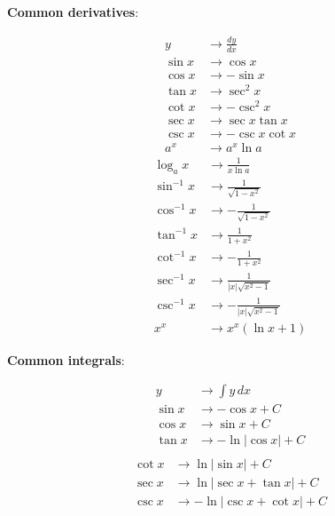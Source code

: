 \documentclass[a4paper,landscape]{article}
\newcommand{\rnname}[1]{\textbf{#1}}
\begin{document}
\begin{multicols*}{3}
\begin{flatitemize}
\item \rnname{Common derivatives}:
\vspace{-2.5em}
\begin{adjustwidth}{-1.2em}{0pt}
\begin{multicols*}{2}
\begin{align*}
y &\longrightarrow \frac{dy}{dx} \\
\sin x &\longrightarrow \cos x \\
\cos x &\longrightarrow -\sin x \\
\tan x &\longrightarrow \sec^2 x \\
\cot x &\longrightarrow -\csc^2 x \\
\sec x &\longrightarrow \sec x \tan x \\
\csc x &\longrightarrow -\csc x \cot x \\
a^x &\longrightarrow a^x \ln a
\end{align*}
\begin{align*}
\log_a x &\textstyle \longrightarrow \frac{1}{x \ln a} \\
\sin^{-1} x &\textstyle \longrightarrow \frac{1}{\sqrt{1-x^2}} \\
\cos^{-1} x &\textstyle \longrightarrow -\frac{1}{\sqrt{1-x^2}} \\
\tan^{-1} x &\textstyle \longrightarrow \frac{1}{1+x^2} \\
\cot^{-1} x &\textstyle \longrightarrow -\frac{1}{1+x^2} \\
\sec^{-1} x &\textstyle \longrightarrow \frac{1}{\left| x \right| \sqrt{x^2-1}} \\
\csc^{-1} x &\textstyle \longrightarrow -\frac{1}{\left| x \right| \sqrt{x^2-1}} \\
x^x &\textstyle \longrightarrow x^x \left( \ln x +1 \right)
\end{align*}
\end{multicols*}
\end{adjustwidth}
\item \rnname{Common integrals}:
\vspace{-2.5em}
\begin{adjustwidth}{-3em}{0pt}
\begin{multicols*}{2}
\begin{align*}
y &\longrightarrow \int y \,dx \\
\sin x &\longrightarrow -\cos x +C \\
\cos x &\longrightarrow \sin x +C \\
\tan x &\longrightarrow -\ln \left| \cos x \right| +C \\
\end{align*}
\begin{align*}
\cot x &\longrightarrow \ln \left| \sin x \right| +C \\
\sec x &\longrightarrow \ln \left| \sec x + \tan x \right| +C \\
\csc x &\longrightarrow -\ln \left| \csc x + \cot x \right| +C
\end{align*}
\end{multicols*}
\end{adjustwidth}


\end{flatitemize}
\end{multicols*}
\end{document}

